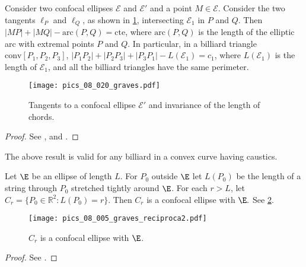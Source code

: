  \begin{proposition} 
 	  \label{prop:dar1} Consider two confocal ellipses $\mathcal E$ and $\mathcal{E}'$ and a point $M\in\mathcal E$. Consider the   two tangents $\ell_P$ and $\ell_Q$,  as shown in   \cref{fig:da_cordas}, intersecting $\mathcal{E}_1$ in $P$ and $Q$. Then $|MP|+|MQ|-\text{arc}{(P,Q)}=\mathrm{cte}$, where $\text{arc}(P,Q)$ is the length of the elliptic arc with extremal points   $P$ and $Q$. In particular, in a   billiard triangle $\text{conv}[P_1,P_2,P_3]$,  $|P_1P_2|+|P_2P_3|+|P_3P_1|-L(\mathcal{E}_1  )=  c_1$, where $L(\mathcal{E}_1) $ is the length of $\mathcal{E}_1$, and all the billiard triangles have the same perimeter.
 	
 \end{proposition}
 \begin{figure}
 \begin{center}
   \texttt{[image: pics\_08\_020\_graves.pdf]}
		\caption{ Tangents to a confocal  ellipse $\mathcal{E}'$ and invariance of the length of chords.}
		\label{fig:da_cordas}
 	\end{center}
\end{figure}
 
 \begin{proof}
 See \cite{chasles1843}, \cite[pp. 283-284]{darboux1917} and \cite[pp. 115-116]{carneiro2005}. 
 \end{proof}
 
  The  above result is valid for any billiard in a convex curve having caustics. 
 
 
      
   \begin{proposition}\label{prop:caustic} Let $\E$ be an ellipse of length $L$.
   For $P_0$  outside $\E$ let $ L(P_0)$   be the length of a string through $P_0$ stretched tightly around $\E$. For each $r>L$, let $C_r=\{P_0\in\mathbb{R}^2: L(P_0)=r\}.$  Then  $C_r$ is a confocal ellipse with $\E.$ See \cref{fig:reciproca_graves}.
      \end{proposition} 
      
       \begin{figure}
 \begin{center}
   \texttt{[image: pics\_08\_005\_graves\_reciproca2.pdf]}
		\caption{ $C_r$ is a confocal  ellipse with $\E$.}
		\label{fig:reciproca_graves}
 	\end{center}
\end{figure}
 \begin{proof} See \cite[page 14]{akopyan2007-conics}.
 \end{proof}